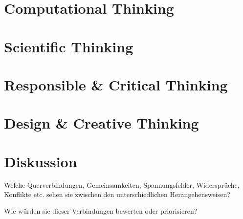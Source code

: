 \documentclass[sigchi-a, authorversion]{acmart}
\begin{document}
\newpage
\section{Computational Thinking}


\newpage

\section{Scientific Thinking}


\newpage

\section{Responsible \& Critical Thinking}


\newpage

\section{Design \& Creative Thinking}


\newpage

\section{Diskussion}

Welche Querverbindungen, Gemeinsamkeiten, Spannungsfelder, Widersprüche, Konflikte etc. sehen sie zwischen den unterschiedlichen Herangehensweisen?

Wie würden sie dieser Verbindungen bewerten oder priorisieren?
\end{document}
